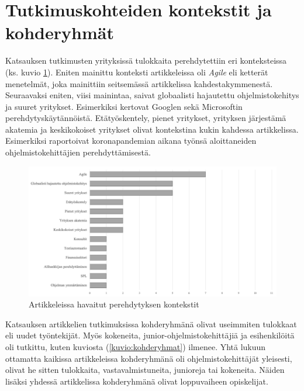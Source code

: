 \documentclass[utf8]{gradu3}
\begin{document}
\section{Tutkimuskohteiden kontekstit ja kohderyhmät}
\label{luku-tulokset-kontekstit-kohderyhmät}

Katsauksen tutkimusten yrityksissä tulokkaita perehdytettiin eri konteksteissa (ks. kuvio \ref{kuvio:kontekstit}). Eniten mainittu konteksti artikkeleissa oli \textit{Agile} eli ketterät menetelmät, joka mainittiin seitsemässä artikkelissa kahdestakymmenestä. Seuraavaksi eniten, viisi mainintaa, saivat globaalisti hajautettu ohjelmistokehitys ja suuret yritykset. Esimerkiksi \textcite{johnson-senges-2010} kertovat Googlen sekä \textcite{rodeghero-ym-2021} \textcite{ju-ym-2021} Microsoftin perehdytyskäytännöistä. Etätyöskentely, pienet yritykset, yrityksen järjestämä akatemia ja keskikokoiset yritykset olivat kontekstina kukin kahdessa artikkelissa. Esimerkiksi \textcite{rodeghero-ym-2021} raportoivat koronapandemian aikana työnsä aloittaneiden ohjelmistokehittäjien perehdyttämisestä.

\begin{figure}[h]
    \centering
    \includegraphics[width=\textwidth]{media/kontekstit.png}
    \caption{Artikkeleissa havaitut perehdytyksen kontekstit}
    \label{kuvio:kontekstit}
\end{figure}

Katsauksen artikkelien tutkimuksissa kohderyhmänä olivat useimmiten tulokkaat eli uudet työntekijät. Myös kokeneita, junior-ohjelmistokehittäjiä ja esihenkilöitä oli tutkittu, kuten kuviosta (\ref{kuvio:kohderyhmat}) ilmenee. Yhtä lukuun ottamatta kaikissa artikkeleissa kohderyhmänä oli ohjelmistokehittäjät yleisesti, olivat he sitten tulokkaita, vastavalmistuneita, junioreja tai kokeneita. Näiden lisäksi yhdessä artikkelissa kohderyhmänä olivat loppuvaiheen opiskelijat.
\end{document}

